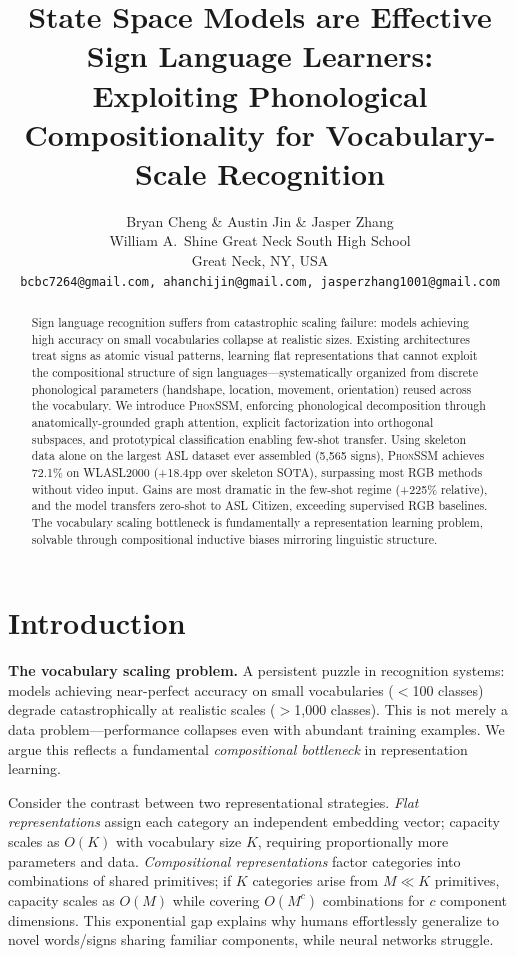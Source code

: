 \documentclass{article}
\title{State Space Models are Effective Sign Language Learners:\\Exploiting Phonological Compositionality for Vocabulary-Scale Recognition}
\author{Bryan Cheng \& Austin Jin \& Jasper Zhang \\
William A.\ Shine Great Neck South High School\\
Great Neck, NY, USA \\
\texttt{bcbc7264@gmail.com, ahanchijin@gmail.com, jasperzhang1001@gmail.com}
}
\theoremstyle{definition}
\theoremstyle{remark}
\newcommand{\phonssm}{\textsc{PhonSSM}}
\begin{document}
\maketitle

\begin{abstract}
Sign language recognition suffers from catastrophic scaling failure: models achieving high accuracy on small vocabularies collapse at realistic sizes. Existing architectures treat signs as atomic visual patterns, learning flat representations that cannot exploit the compositional structure of sign languages---systematically organized from discrete phonological parameters (handshape, location, movement, orientation) reused across the vocabulary. We introduce \phonssm{}, enforcing phonological decomposition through anatomically-grounded graph attention, explicit factorization into orthogonal subspaces, and prototypical classification enabling few-shot transfer. Using skeleton data alone on the largest ASL dataset ever assembled (5,565 signs), \phonssm{} achieves 72.1\% on WLASL2000 (+18.4pp over skeleton SOTA), surpassing most RGB methods without video input. Gains are most dramatic in the few-shot regime (+225\% relative), and the model transfers zero-shot to ASL Citizen, exceeding supervised RGB baselines. The vocabulary scaling bottleneck is fundamentally a representation learning problem, solvable through compositional inductive biases mirroring linguistic structure.
\end{abstract}

\section{Introduction}

\textbf{The vocabulary scaling problem.} A persistent puzzle in recognition systems: models achieving near-perfect accuracy on small vocabularies ($<$100 classes) degrade catastrophically at realistic scales ($>$1,000 classes). This is not merely a data problem---performance collapses even with abundant training examples. We argue this reflects a fundamental \textit{compositional bottleneck} in representation learning.

Consider the contrast between two representational strategies. \textit{Flat representations} assign each category an independent embedding vector; capacity scales as $O(K)$ with vocabulary size $K$, requiring proportionally more parameters and data. \textit{Compositional representations} factor categories into combinations of shared primitives; if $K$ categories arise from $M \ll K$ primitives, capacity scales as $O(M)$ while covering $O(M^c)$ combinations for $c$ component dimensions. This exponential gap explains why humans effortlessly generalize to novel words/signs sharing familiar components, while neural networks struggle.
\end{document}
